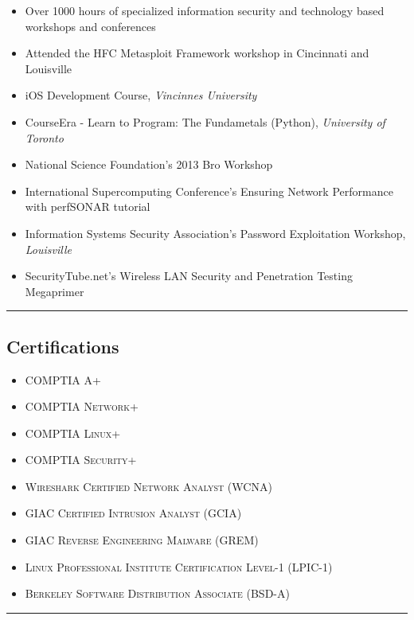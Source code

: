 \documentclass[10pt,letterpaper]{article}
\begin{document}
\begin{itemize}
	\parskip=0.1em
	\item Over 1000 hours of specialized information security and technology based workshops and conferences
	\item Attended the HFC Metasploit Framework workshop in Cincinnati and Louisville
	\item iOS Development Course, \textit{Vincinnes University}
	\item CourseEra - Learn to Program: The Fundametals (Python), \textit{University of Toronto}
	\item National Science Foundation's 2013 Bro Workshop
	\item International Supercomputing Conference's Ensuring Network Performance with perfSONAR tutorial
	\item Information Systems Security Association's Password Exploitation Workshop, \textit{Louisville}
	\item SecurityTube.net's Wireless LAN Security and Penetration Testing Megaprimer
\end{itemize}

\hrule
\vspace{-0.4em}
\subsection*{Certifications}

\begin{itemize}
	\parskip=0.1em

	\item \textsc{COMPTIA A+}
	\item \textsc{COMPTIA Network+}
	\item \textsc{COMPTIA Linux+}
	\item \textsc{COMPTIA Security+}
	\item \textsc{Wireshark Certified Network Analyst (WCNA)}
	\item \textsc{GIAC Certified Intrusion Analyst (GCIA)}
	\item \textsc{GIAC Reverse Engineering Malware (GREM)}
	\item \textsc{Linux Professional Institute Certification Level-1 (LPIC-1)}
	\item \textsc{Berkeley Software Distribution Associate (BSD-A)}

\end{itemize}

\newpage

\hrule
\vspace{-0.4em}
\end{document}
